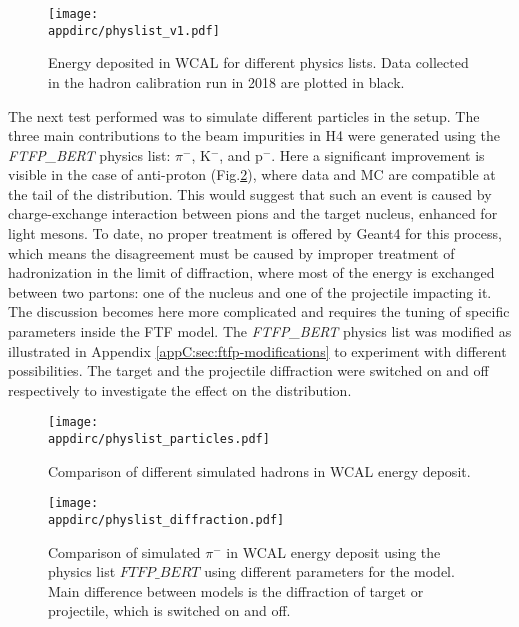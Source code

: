 \begin{figure}[tbh!]
  \centering
  \texttt{[image: \\appdirc/physlist\_v1.pdf]}
  \caption[Comparison of physics list for $\pi^-$ in WCAL energy spectrum]{Energy deposited in WCAL for different physics lists. Data collected in the hadron calibration run in 2018 are plotted in black.}
  \label{fig:geant4-hadron-plist}
\end{figure}

The next test performed was to simulate different particles in the setup. The three main contributions to the beam impurities in H4 were generated using the \textit{FTFP\_BERT} physics list: $\pi^-$, K$^-$, and p$^-$. Here a significant improvement is visible in the case of anti-proton (Fig.\ref{fig:geant4-hadron-particles}), where data and MC are compatible at the tail of the distribution. This would suggest that such an event is caused by charge-exchange interaction between pions and the target nucleus, enhanced for light mesons. To date, no proper treatment is offered by Geant4 for this process, which means the disagreement must be caused by improper treatment of hadronization in the limit of diffraction, where most of the energy is exchanged between two partons: one of the nucleus and one of the projectile impacting it. The discussion becomes here more complicated and requires the tuning of specific parameters inside the FTF model.  The \textit{FTFP\_BERT} physics list was modified as illustrated in Appendix \ref{appC:sec:ftfp-modifications} to experiment with different possibilities. The target and the projectile diffraction were switched on and off respectively to investigate the effect on the distribution.

\begin{figure}[tbh!]
  \centering
  \texttt{[image: \\appdirc/physlist\_particles.pdf]}
  \caption[Comparison of different simulated hadrons in WCAL energy spectrum]{Comparison of different simulated hadrons in WCAL energy deposit.}
  \label{fig:geant4-hadron-particles}
\end{figure}

\begin{figure}[tbh!]
  \centering
  \texttt{[image: \\appdirc/physlist\_diffraction.pdf]}
  \caption[Comparison of different diffraction limits for hadrons in WCAL energy spectrum]{Comparison of simulated $\pi^-$ in WCAL energy deposit using the physics list $FTFP\_BERT$ using different parameters for the model. Main difference between models is the diffraction of target or projectile, which is switched on and off.}
  \label{fig:geant4-hadron-diff}
\end{figure}

